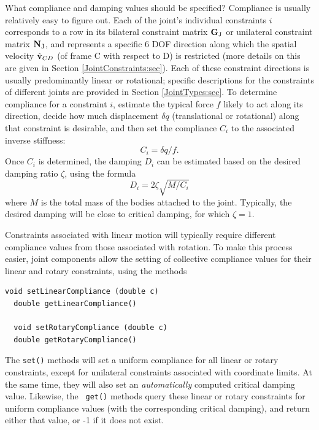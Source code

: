 What compliance and damping values should be specified? Compliance is
usually relatively easy to figure out. Each of the joint's individual
constraints $i$ corresponds to a row in its bilateral constraint matrix
${\bf G}_\text{J}$ or unilateral constraint matrix ${\bf N}_\text{J}$, and represents a
specific 6 DOF direction along which the spatial velocity
$\hat{{\bf v}}_{CD}$ (of frame C with respect to D) is restricted (more
details on this are given in Section \ref{JointConstraints:sec}).
Each of these constraint directions is usually predominantly linear or
rotational; specific descriptions for the constraints of different
joints are provided in Section \ref{JointTypes:sec}. To determine
compliance for a constraint $i$, estimate the typical force $f$ likely
to act along its direction, decide how much displacement $\delta q$
(translational or rotational) along that constraint is desirable, and
then set the compliance $C_i$ to the associated inverse stiffness:
%
\begin{equation}
C_i = \delta q/f.
\end{equation}
%
Once $C_i$ is determined, the damping $D_i$ can be estimated based on
the desired damping ratio $\zeta$, using the formula
%
\begin{equation}
D_i = 2 \zeta \sqrt{M/C_i}
\label{constraintDamping:eqn}
\end{equation}
%
where $M$ is the total mass of the bodies attached to the joint.
Typically, the desired damping will be close to critical damping, for
which $\zeta = 1$.

Constraints associated with linear motion will typically require
different compliance values from those associated with rotation.  To
make this process easier, joint components allow the setting of
collective compliance values for their linear and rotary constraints,
using the methods
\begin{lstlisting}[]
  void setLinearCompliance (double c)
  double getLinearCompliance()

  void setRotaryCompliance (double c)
  double getRotaryCompliance()
\end{lstlisting}
%
The {\tt set()} methods will set a uniform compliance for all linear or
rotary constraints, except for unilateral constraints associated with
coordinate limits. At the same time, they will also set an {\it
automatically} computed critical damping value. Likewise, the {\tt
get()} methods query these linear or rotary constraints for uniform
compliance values (with the corresponding critical damping), and
return either that value, or -1 if it does not exist.

